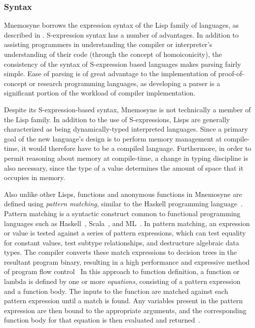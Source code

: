\documentclass[11pt,a4paper]{article}
\theoremstyle{break}
\begin{document}
\subsubsection{Syntax}

Mnemosyne borrows the expression syntax of the Lisp family of languages, as described in . S-expression syntax has a number of advantages. In addition to assisting programmers in understanding the compiler or interpreter's understanding of their code (through the concept of homoiconicity), the consistency of the syntax of S-expression based languages makes parsing fairly simple. Ease of parsing is of great advantage to the implementation of proof-of-concept or research programming languages, as developing a parser is a significant portion of the workload of compiler implementation.

Despite its S-expression-based syntax, Mnemosyne is not technically a member of the Lisp family. In addition to the use of S-expressions, Lisps are generally characterized as being dynamically-typed interpreted languages. Since a primary goal of the new language's design is to perform memory management at compile-time, it would therefore have to be a compiled language. Furthermore, in order to permit reasoning about memory at compile-time, a change in typing discipline is also necessary, since the type of a value determines the amount of space that it occupies in memory.

Also unlike other Lisps, functions and anonymous functions in Mnemosyne are defined using \textit{pattern matching}, similar to the Haskell programming language~\cite{jones2003haskell,hudak1992gentle,hudak1992report}. Pattern matching is a syntactic construct common to functional programming languages such as Haskell~\cite{jones2003haskell,hudak1992report,hudak1992gentle}, Scala~\cite{odersky2004scala,odersky2004overview}, and ML~\cite{maranget2008compiling,Krishnaswami:2009:FPM:1594834.1480927}. In pattern matching, an expression or value is tested against a series of pattern expressions, which can test equality for constant values, test subtype relationships, and destructure algebraic data types. The compiler converts these match expressions to decision trees in the resultant program binary, resulting in a high performance and expressive method of program flow control~\cite{maranget2007warnings,Krishnaswami:2009:FPM:1594834.1480927,syme2007extensible,maranget2008compiling} In this approach to function definition, a function or lambda is defined by one or more \textit{equations}, consisting of a pattern expression and a function body. The inputs to the function are matched against each pattern expression until a match is found. Any variables present in the pattern expression are then bound to the appropriate arguments, and the corresponding function body for that equation is then evaluated and returned~\cite{jones2003haskell,hudak1992report}.
\end{document}
